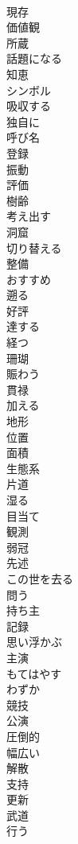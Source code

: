 \documentclass[8pt]{extreport}
\begin{document}
\begin{CJK}{UTF8}{min}
\\	現存
\\	価値観
\\	所蔵
\\	話題になる
\\	知恵
\\	シンボル
\\	吸収する
\\	独自に
\\	呼び名
\\	登録
\\	振動
\\	評価
\\	樹齢
\\	考え出す
\\	洞窟
\\	切り替える
\\	整備
\\	おすすめ
\\	遡る
\\	好評
\\	達する
\\	経つ
\\	珊瑚
\\	賑わう
\\	貫禄
\\	加える
\\	地形
\\	位置
\\	面積
\\	生態系
\\	片道
\\	湿る
\\	目当て
\\	観測
\\	弱冠
\\	先述
\\	この世を去る
\\	問う
\\	持ち主
\\	記録
\\	思い浮かぶ
\\	主演
\\	もてはやす
\\	わずか
\\	競技
\\	公演
\\	圧倒的
\\	幅広い
\\	解散
\\	支持
\\	更新
\\	武道
\\	行う

\end{CJK}
\end{document}
